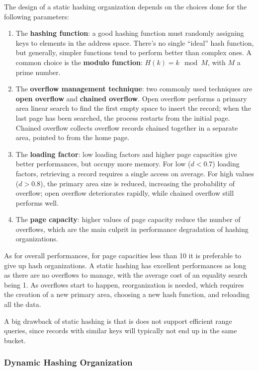 The design of a static hashing organization depends on the choices done for the following parameters:
\begin{enumerate}
    \item The \textbf{hashing function}: a good hashing function must randomly assigning keys to elements in the address space. There's no single ``ideal'' hash function, but generally, simpler functions tend to perform better than complex ones. A common choice is the \textbf{modulo function}: $H(k) = k \mod M$, with $M$ a prime number.

    \item The \textbf{overflow management technique}: two commonly used techniques are \textbf{open overflow} and \textbf{chained overflow}. Open overflow performs a primary area linear search to find the first empty space to insert the record; when the last page has been searched, the process restarts from the initial page. Chained overflow collects overflow records chained together in a separate area, pointed to from the home page.

    \item The \textbf{loading factor}: low loading factors and higher page capacities give better performances, but occupy more memory. For low ($d < 0.7$) loading factors, retrieving a record requires a single access on average. For high values ($d > 0.8$), the primary area size is reduced, increasing the probability of overflow; open overflow deteriorates rapidly, while chained overflow still performs well.  

    \item The \textbf{page capacity}: higher values of page capacity reduce the number of overflows, which are the main culprit in performance degradation of hashing organizations.
\end{enumerate}
As for overall performances, for page capacities less than 10 it is preferable to give up hash organizations. A static hashing has excellent performances as long as there are no overflows to manage, with the average cost of an equality search being 1. As overflows start to happen, reorganization is needed, which requires the creation of a new primary area, choosing a new hash function, and reloading all the data.

A big drawback of static hashing is that is does not support efficient range queries, since records with similar keys will typically not end up in the same bucket.

\subsubsection{Dynamic Hashing Organization}

